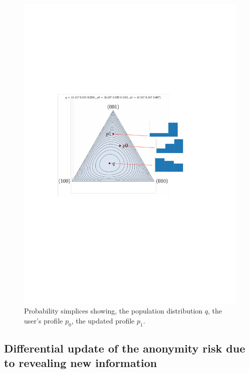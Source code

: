 \begin{figure}[htb]
\centering
\includegraphics[scale=0.5]{figures/triplex_profiles.pdf}
\caption{Probability simplices showing, the population distribution $q$, the user's profile $p_0$, the updated profile $p_1$.}
\label{fig:2-1}
\end{figure}

\subsection{Differential update of the anonymity risk due to revealing new information}
\label{sec:1.4}

